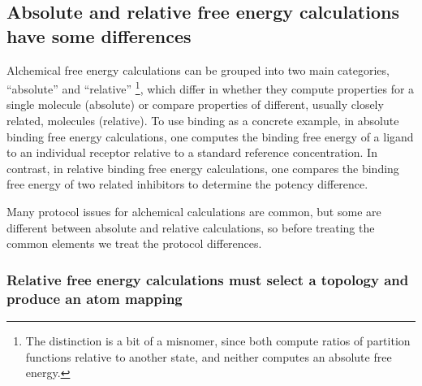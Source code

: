 \documentclass[9pt,bestpractices]{livecoms}
\begin{document}
\subsection{Absolute and relative free energy calculations have some differences}

Alchemical free energy calculations can be grouped into two main categories, ``absolute'' and ``relative'' \footnote{The distinction is a bit of a misnomer, since both compute ratios of partition functions relative to another state, and neither computes an absolute free energy.}, which differ in whether they compute properties for a single molecule (absolute) or compare properties of different, usually closely related, molecules (relative).
To use binding as a concrete example, in absolute binding free energy calculations, one computes the binding free energy of a ligand to an individual receptor relative to a standard reference concentration.
In contrast, in relative binding free energy calculations, one compares the binding free energy of two related inhibitors to determine the potency difference.

Many protocol issues for alchemical calculations are common, but some are different between absolute and relative calculations, so before treating the common elements we treat the protocol differences.

\subsubsection{Relative free energy calculations must select a topology and produce an atom mapping}
\end{document}
